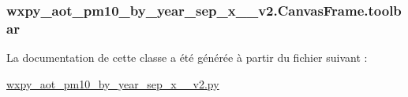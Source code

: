 \hypertarget{classwxpy__aot__pm10__by__year__sep__x__2009__v2_1_1_canvas_frame_add8b71a2663ce00a7e77b490bbed6a61}{
\subsubsection[{toolbar}]{\setlength{\rightskip}{0pt plus 5cm}wxpy\-\_\-aot\-\_\-pm10\-\_\-by\-\_\-year\-\_\-sep\-\_\-x\-\_\-\_\-v2.\-Canvas\-Frame.\-toolbar}}\label{classwxpy__aot__pm10__by__year__sep__x__2009__v2_1_1_canvas_frame_add8b71a2663ce00a7e77b490bbed6a61}


La documentation de cette classe a été générée à partir du fichier suivant \-:\begin{DoxyCompactItemize}
\item 
\hyperlink{wxpy__aot__pm10__by__year__sep__x__2009__v2_8py}{wxpy\-\_\-aot\-\_\-pm10\-\_\-by\-\_\-year\-\_\-sep\-\_\-x\-\_\-\_\-v2.\-py}\end{DoxyCompactItemize}
